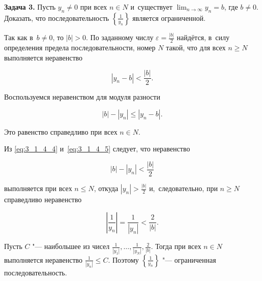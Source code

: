 \textbf{Задача 3.}\label{ex:3_1_4_3} Пусть $y_{n} \ne 0$ при всех $n \in N$
и~существует $\displaystyle \lim_{n \to \infty} y_{n} = b$, где $b \ne 0$.
Доказать, что последовательность $\displaystyle \left\{ \frac{1}{y_{n}} \right\}$
является ограниченной.

Так как в~$b \ne 0$, то $|b| > 0$. По заданному числу
$\displaystyle \varepsilon = \frac{|b|}{2}$ найдётся, в~силу определения предела
последовательности, номер $N$ такой, что для всех $n \geqslant N$ выполняется
неравенство

\begin{equation}\label{eq:3_1_4_4}
\displaystyle |y_{n} - b| < \frac{|b|}{2}.
\end{equation}

\noindent
Воспользуемся неравенством для модуля разности

\begin{equation}\label{eq:3_1_4_5}
|b| - |y_{n}| \leqslant |y_{n} - b|.
\end{equation}

\noindent
Это равенство справедливо при всех $n \in N$.

Из \eqref{eq:3_1_4_4} и~\eqref{eq:3_1_4_5} следует, что неравенство

\begin{equation*}
\displaystyle |b| - |y_{n}| < \frac{|b|}{2}
\end{equation*}

\noindent
выполняется при всех $n \leqslant N$, откуда $\displaystyle |y_{n}| > \frac{|b|}{2}$
и,~следовательно, при $n \geqslant N$ справедливо неравенство

\begin{equation*}
\displaystyle \left| \frac{1}{y_{n}} \right| = \frac{1}{|y_{n}|} < \frac{2}{|b|}.
\end{equation*}

\noindent
Пусть $C$ "--- наибольшее из чисел
$\displaystyle \frac{1}{|y_{1}|}, \dots, \frac{1}{|y_{N}|}, \frac{2}{|b|}$.
Тогда при всех $n \in N$ выполняется неравенство
$\displaystyle \frac{1}{|y_{n}|} \leqslant C$.
Поэтому $\displaystyle \left\{ \frac{1}{y_{n}} \right\}$ "--- ограниченная
последовательность.


